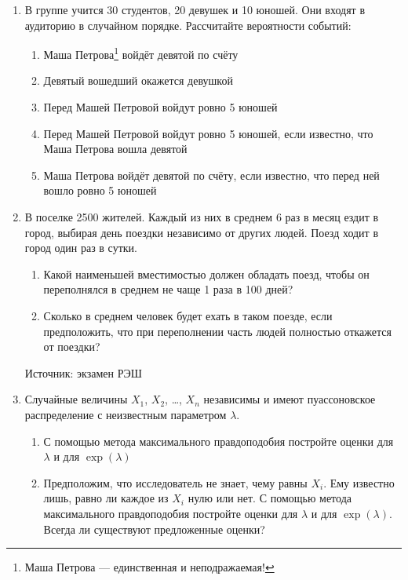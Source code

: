 \documentclass[12pt, a4paper]{article}\usepackage[]{graphicx}\usepackage[]{color}
\begin{document}
				\begin{enumerate}
					\item В группе учится 30 студентов, 20 девушек и 10 юношей. Они входят в аудиторию в случайном порядке. Рассчитайте вероятности событий:
					\begin{enumerate}
						\item Маша Петрова\footnote{Маша Петрова — единственная и неподражаемая!} войдёт девятой по счёту
						\item Девятый вошедший окажется девушкой
						\item Перед Машей Петровой войдут ровно 5 юношей
						\item Перед Машей Петровой войдут ровно 5 юношей, если известно, что Маша Петрова вошла девятой
						\item Маша Петрова войдёт девятой по счёту, если известно, что перед ней вошло ровно 5 юношей
					\end{enumerate}

					\item В поселке 2500 жителей. Каждый из них в среднем 6 раз в месяц ездит в город, выбирая день поездки независимо от других людей. Поезд ходит в город один раз в сутки.
					\begin{enumerate}
						\item Какой наименьшей вместимостью должен обладать поезд, чтобы он переполнялся в среднем не чаще 1 раза в 100 дней?
						\item Сколько в среднем человек будет ехать в таком поезде, если предположить, что при переполнении часть людей полностью откажется от поездки?
					\end{enumerate}

					Источник: экзамен РЭШ

					\item Случайные величины $X_1$, $X_2$, \ldots, $X_n$ независимы и имеют пуассоновское распределение с неизвестным параметром $\lambda$.
					\begin{enumerate}
						\item С помощью метода максимального правдоподобия постройте оценки для $\lambda$ и для $\exp(\lambda)$
						\item Предположим, что исследователь не знает, чему равны $X_i$. Ему известно лишь, равно ли каждое из $X_i$ нулю или нет. С помощью метода максимального правдоподобия постройте оценки для $\lambda$ и для $\exp(\lambda)$. Всегда ли существуют предложенные оценки?
					\end{enumerate}



\end{enumerate}
\end{document}
